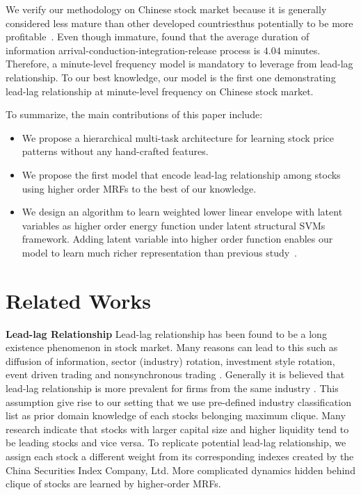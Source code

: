 \documentclass[sigconf,anonymous,review]{acmart}
\renewcommand{\citename}{\citet}
\renewcommand{\cite}{\citep}
\begin{document}
We verify our methodology on Chinese stock market because
it is generally considered less mature than other developed
countries\textquotesingle thus potentially to be more
profitable~\cite{bessembinder1995profitability}. Even though
immature, \citename{fangyan2012} found that the average duration
of information arrival-conduction-integration-release process is
$4.04$ minutes. Therefore, a minute-level frequency model is
mandatory to leverage from lead-lag relationship. To our best
knowledge, our model is the first one demonstrating lead-lag
relationship at minute-level frequency on Chinese stock market.

To summarize, the main contributions of this paper include: 
\begin{itemize}
\item  We propose a
hierarchical multi-task architecture for learning stock price
patterns without any hand-crafted features.
\item We propose the
first model that encode lead-lag relationship among stocks using
higher order MRFs to the best of our knowledge. \item We design an
algorithm to learn weighted lower linear envelope with latent
variables as higher order energy function under latent structural
SVMs framework. Adding latent variable into higher order function
enables our model to learn much richer representation than
previous study~\cite{gouldlearning}.
\end{itemize}


\section{Related Works}
\label{sec:background}

\textbf{Lead-lag Relationship} Lead-lag relationship has been
found to be a long existence phenomenon in stock market. Many
reasons can lead to this such as diffusion of information, sector
(industry) rotation, investment style rotation, event driven
trading and nonsynchronous trading
\cite{lo1990contrarian,chordia2000trading,conrad1988time,hameed1997time}.
Generally it is believed that lead-lag relationship is more
prevalent for firms from the same industry
\cite{hou2007industry}. This assumption give rise to our setting
that we use pre-defined industry classification list \cite{ths}
as prior domain knowledge of each stock\textquotesingle s belonging maximum
clique. Many research \cite{brennan1993investment,hou2007industry,badrinath1995shepherds,mcqueen1996delayed}
indicate that stocks with larger capital
size and higher liquidity tend to be leading stocks and vice versa.
To replicate potential lead-lag relationship, we assign each stock a
different weight from its corresponding indexes created by the China 
Securities Index Company, Ltd. More complicated dynamics hidden behind clique
of stocks are learned by higher-order MRFs.
\end{document}
